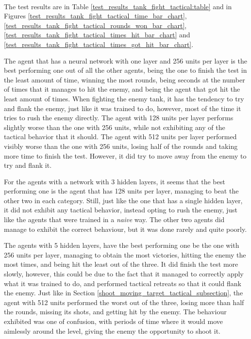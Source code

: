 \paragraph{}
The test results are in Table \ref{test_results_tank_fight_tactical:table} and in Figures \ref{test_results_tank_fight_tactical_time_bar_chart}, \ref{test_results_tank_fight_tactical_rounds_won_bar_chart}, \ref{test_results_tank_fight_tactical_times_hit_bar_chart} and \ref{test_results_tank_fight_tactical_times_got_hit_bar_chart}.

The agent that has a neural network with one layer and 256 units per layer is the best performing one out of all the other agents, being the one to finish the test in the least amount of time, winning the most rounds, being seconds at the number of times that it manages to hit the enemy, and being the agent that got hit the least amount of times. When fighting the enemy tank, it has the tendency to try and flank the enemy, just like it was trained to do, however, most of the time it tries to rush the enemy directly. The agent with 128 units per layer performs slightly worse than the one with 256 units, while not exhibiting any of the tactical behavior that it should. The agent with 512 units per layer performed visibly worse than the one with 256 units, losing half of the rounds and taking more time to finish the test. However, it did try to move away from the enemy to try and flank it.

For the agents with a network with 3 hidden layers, it seems that the best performing one is the agent that has 128 units per layer, managing to beat the other two in each category. Still, just like the one that has a single hidden layer, it did not exhibit any tactical behavior, instead opting to rush the enemy, just like the agents that were trained in a \emph{naive} way. The other two agents did manage to exhibit the correct behaviour, but it was done rarely and quite poorly.

The agents with 5 hidden layers, have the best performing one be the one with 256 units per layer, managing to obtain the most victories, hitting the enemy the most times, and being hit the least out of the three. It did finish the test more slowly, however, this could be due to the fact that it managed to correctly apply what it was trained to do, and performed tactical retreats so that it could flank the enemy. Just like in Section \ref{shoot_moving_target_tactical_subsection}, the agent with 512 units performed the worst out of the three, losing more than half the rounds, missing its shots, and getting hit by the enemy. The behaviour exhibited was one of confusion, with periods of time where it would move aimlessly around the level, giving the enemy the opportunity to shoot it.


